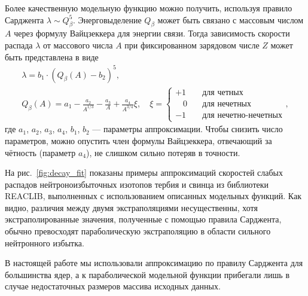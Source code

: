  Более качественную модельную функцию можно получить, используя правило Сарджента $\lambda \sim Q_\beta^5$. Энерговыделение $Q_\beta$ может быть связано с массовым числом $A$ через формулу Вайцзеккера для энергии связи. Тогда зависимость скорости распада $\lambda$ от массового числа $A$ при фиксированном зарядовом числе $Z$ может быть представлена в виде
\begin{equation}
\begin{gathered}
  \displaystyle
  \lambda = b_1 \cdot (Q_\beta(A) - b_2)^5,\\
  Q_\beta(A) = 
  a_1 - \frac{a_2}{A^{1/3}} - \frac{a_3}{A} + \frac{a_4}{A^{3/4}} \xi,
  \quad \xi =
  \begin{cases}
    +1& \quad\text{для четных} \\
    \hspace{11pt}0& \quad\text{для нечетных} \\
    -1& \quad\text{для нечетно-нечетных}
  \end{cases},
\end{gathered}
\end{equation}
где $a_1$, $a_2$, $a_3$, $a_4$, $b_1$, $b_2$ --- параметры аппроксимации. Чтобы снизить число параметров, можно опустить член формулы Вайцзеккера, отвечающий за чётность (параметр $a_4$), не слишком сильно потеряв в точности.

  На рис.~\ref{fig:decay_fit} показаны примеры аппроксимаций скоростей слабых распадов нейтроноизбыточных изотопов тербия и свинца из библиотеки REACLIB, выполненных с использованием описанных модельных функций. Как видно, различия между двумя экстраполяциями несущественны, хотя экстраполированные значения, полученные с помощью правила Сарджента, обычно превосходят параболическую экстраполяцию в области сильного нейтронного избытка.
  
  В настоящей работе мы использовали аппроксимацию по правилу Сарджента для большинства ядер, а к параболической модельной функции прибегали лишь в случае недостаточных размеров массива исходных данных.
  
